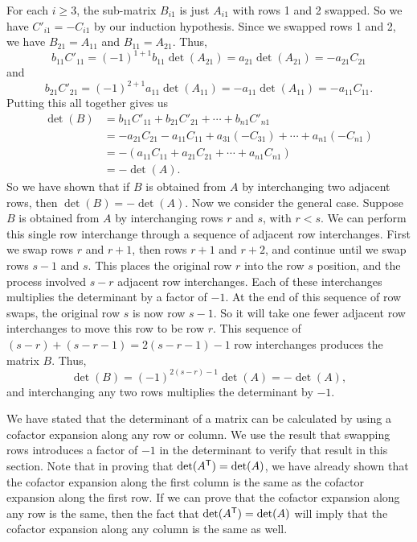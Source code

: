For each $i \geq 3$, the sub-matrix $B_{i1}$ is just $A_{i1}$ with rows 1 and 2 swapped. So we have $C'_{i1} = -C_{i1}$ by our induction hypothesis. Since we swapped rows 1 and 2, we have $B_{21} = A_{11}$ and $B_{11} = A_{21}$. Thus,
\[b_{11}C'_{11} = (-1)^{1+1}b_{11}\det(A_{21}) = a_{21}\det(A_{21}) = -a_{21}C_{21}\]
and
\[b_{21}C'_{21} = (-1)^{2+1}a_{11}\det(A_{11}) = -a_{11}\det(A_{11}) = -a_{11}C_{11}.\]
Putting this all together gives us
\begin{align*}
\det(B) &= b_{11}C'_{11} + b_{21}C'_{21} + \cdots + b_{n1}C'_{n1} \\
	&= -a_{21}C_{21} - a_{11}C_{11} + a_{31}(-C_{31}) + \cdots + a_{n1}(-C_{n1}) \\
	&= -\left(a_{11}C_{11} + a_{21}C_{21} + \cdots + a_{n1}C_{n1}\right) \\
	&= - \det(A).
\end{align*}
So we have shown that if $B$ is obtained from $A$ by interchanging two adjacent rows, then $\det(B) = -\det(A)$. Now we consider the general case. Suppose $B$ is obtained from $A$ by interchanging rows $r$ and $s$, with $r < s$. We can perform this single row interchange through a sequence of adjacent row interchanges. First we swap rows $r$ and $r+1$, then rows $r+1$ and $r+2$, and continue until we swap rows $s-1$ and $s$. This places the original row $r$ into the row $s$ position, and the process involved $s-r$ adjacent row interchanges. Each of these interchanges multiplies the determinant by a factor of $-1$. At the end of this sequence of row swaps, the original row $s$ is now row $s-1$. So it will take one fewer adjacent row interchanges to move this row to be row $r$. This sequence of $(s-r)+(s-r-1) = 2(s-r-1)-1$ row interchanges produces the matrix $B$. Thus,
\[\det(B) = (-1)^{2(s-r)-1}\det(A) = -\det(A),\]
and interchanging any two rows multiplies the determinant by $-1$. 



\label{sec:cofactor_expand}

We have stated that the determinant of a matrix can be calculated by using a cofactor expansion along any row or column. We use the result that swapping rows introduces a factor of $-1$ in the determinant to verify that result in this section. Note that in proving that $\det(A^{\mathsf{T}}) = \det(A)$, we have already shown that the cofactor expansion along the first column is the same as the cofactor expansion along the first row. If we can prove that the cofactor expansion along any row is the same, then the fact that $\det(A^{\mathsf{T}}) = \det(A)$ will imply that the cofactor expansion along any column is the same as well.


